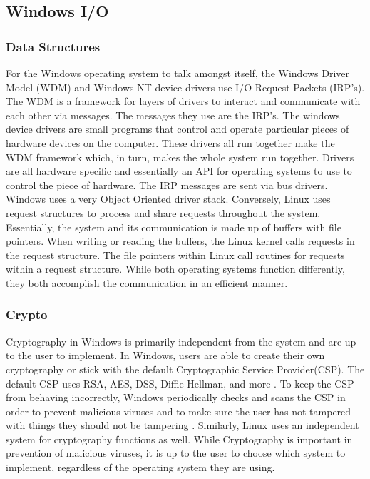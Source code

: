 \documentclass[draftclsnofoot, onecolumn, compsoc, 10pt]{IEEEtran}
\begin{document}
\subsection{Windows I/O}
\subsubsection{Data Structures}
For the Windows operating system to talk amongst itself, the Windows Driver Model (WDM) and Windows NT device drivers use I/O Request Packets (IRP's). The WDM is a framework for layers of drivers to interact and communicate with each other via messages. The messages they use are the IRP's. The windows device drivers are small programs that control and operate particular pieces of hardware devices on the computer. These drivers all run together make the WDM framework which, in turn, makes the whole system run together. Drivers are all hardware specific and essentially an API for operating systems to use to control the piece of hardware. The IRP messages are sent via bus drivers. Windows uses a very Object Oriented driver stack. Conversely, Linux uses request structures to process and share requests throughout the system. Essentially, the system and its communication is made up of buffers with file pointers. When writing or reading the buffers, the Linux kernel calls requests in the request structure. The file pointers within Linux call routines for requests within a request structure. While both operating systems function differently, they both accomplish the communication in an efficient manner. \cite{windowsbookpt2}

\subsubsection{Crypto}
Cryptography in Windows is primarily independent from the system and are up to the user to implement. In Windows, users are able to create their own cryptography or stick with the default Cryptographic Service Provider(CSP). The default CSP uses RSA, AES, DSS, Diffie-Hellman, and more \cite{microsoft}. To keep the CSP from behaving incorrectly, Windows periodically checks and scans the CSP in order to prevent malicious viruses and to make sure the user has not tampered with things they should not be tampering \cite{CSP}. Similarly, Linux uses an independent system for cryptography functions as well. While Cryptography is important in prevention of malicious viruses, it is up to the user to choose which system to implement, regardless of the operating system they are using. 
\end{document}

